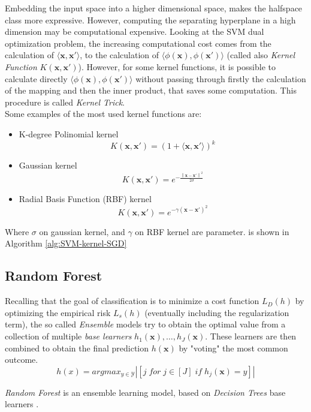 Embedding the input space into a higher dimensional space, makes the halfspace class more expressive. However, computing the separating hyperplane in a high dimension may be computational expensive. Looking at the \ac{SVM} dual optimization problem, the increasing computational cost comes from the calculation of $\langle \mathbf{x}, \mathbf{x}' \rangle$, to the calculation of $\langle \phi(\mathbf{x}), \phi(\mathbf{x}') \rangle$ (called also \textit{Kernel Function} $K(\mathbf{x}, \mathbf{x}')$). However, for some kernel functions, it is possible to calculate directly $\langle \phi(\mathbf{x}), \phi(\mathbf{x}') \rangle$ without passing through firstly the calculation of the mapping and then the inner product, that saves some computation. This procedure is called \textit{Kernel Trick}.\\
Some examples of the  most used kernel functions are:
\begin{itemize}
	\item K-degree Polinomial kernel
	\[K(\mathbf{x}, \mathbf{x}') = (1 + \langle \mathbf{x}, \mathbf{x}' \rangle)^k\]
	\item Gaussian kernel 
	\[K(\mathbf{x}, \mathbf{x}') = e^{- \frac{\left\lVert \mathbf{x} - \mathbf{x}' \right\rVert^2}{2 \sigma}} \]
	\item Radial Basis Function (RBF) kernel
	\[K(\mathbf{x}, \mathbf{x}') = e^{- \gamma \left( \mathbf{x} - \mathbf{x}' \right)^2} \]
\end{itemize}
Where $\sigma$ on gaussian kernel, and $\gamma$ on RBF kernel are parameter. is shown in Algorithm \ref{alg:SVM-kernel-SGD}


\subsection{Random Forest}

Recalling that the goal of classification is to minimize a cost function $L_D(h)$ by optimizing the empirical risk $L_s(h)$ (eventually including the regularization term), the so called \textit{Ensemble} models try to obtain the optimal value from a collection of multiple \textit{base learners} $h_1(\mathbf{x}), \dots, h_J(\mathbf{x})$. These learners are then combined to obtain the final prediction $h(\mathbf{x})$ by "voting" the most common outcome.
\[ h(x) = argmax_{y \in \mathcal{Y}} |[j \; for \; j \in [J] \; if \; h_j(\mathbf{x}) = y]| \] 

\textit{Random Forest} is an ensemble learning model, based on \textit{Decision Trees} base learners \cite{inbook}.

